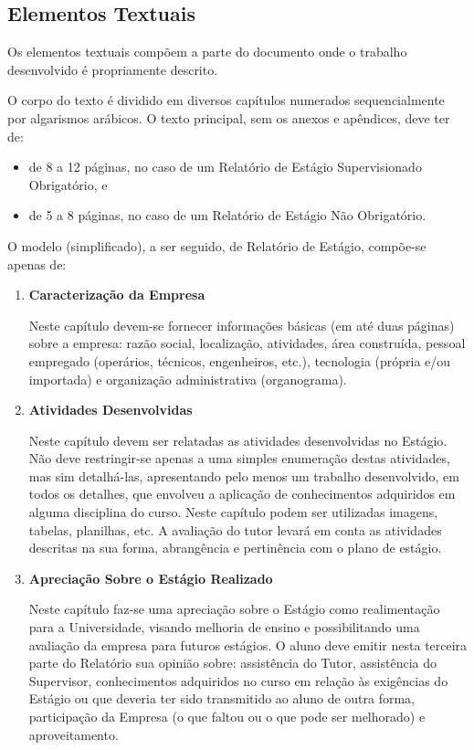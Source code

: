 \documentclass[repeatfields,xlists,xpacks,oneside,yearsonly]{ufrgscca}
\begin{document}
    \subsection{Elementos Textuais}

    Os elementos textuais compõem a parte do documento onde o trabalho
    desenvolvido é propriamente descrito.

    O corpo do texto é dividido em diversos capítulos numerados sequencialmente
    por algarismos arábicos. O texto principal, sem os anexos e apêndices, deve ter de:
    \begin{itemize}
        \item de 8 a 12 páginas, no caso de um Relatório de Estágio Supervisionado Obrigatório, e
        \item de 5 a 8 páginas, no caso de um Relatório de Estágio Não Obrigatório.
    \end{itemize}

    O modelo (simplificado), a ser seguido, de Relatório de Estágio, compõe-se apenas de:


    \begin{enumerate}[tcc]
        \item \textbf{Caracterização da Empresa}

        Neste capítulo devem-se fornecer informações básicas (em até duas páginas) sobre a empresa: razão social, localização, atividades, área construída, pessoal empregado (operários, técnicos, engenheiros, etc.), tecnologia (própria e/ou importada) e organização administrativa (organograma).

        \item  \textbf{Atividades Desenvolvidas}

        Neste capítulo devem ser relatadas as atividades desenvolvidas no Estágio. Não deve restringir-se apenas a uma simples enumeração destas atividades, mas sim detalhá-las, apresentando pelo menos um trabalho desenvolvido, em todos os detalhes, que envolveu a aplicação de conhecimentos adquiridos em alguma disciplina do curso. Neste capítulo podem ser utilizadas imagens, tabelas, planilhas, etc. A avaliação do tutor levará em conta as atividades descritas na sua forma, abrangência e pertinência com o plano de estágio.

        \item \textbf{Apreciação Sobre o Estágio Realizado}

        Neste capítulo faz-se uma apreciação sobre o Estágio como realimentação para a Universidade, visando melhoria de ensino e possibilitando uma avaliação da empresa para futuros estágios. O aluno deve emitir nesta terceira parte do Relatório sua opinião sobre: assistência do Tutor, assistência do Supervisor, conhecimentos adquiridos no curso em relação às exigências do Estágio ou que deveria ter sido transmitido ao aluno de outra forma, participação da Empresa (o que faltou ou o que pode ser melhorado) e aproveitamento.
    \end{enumerate}
\end{document}
